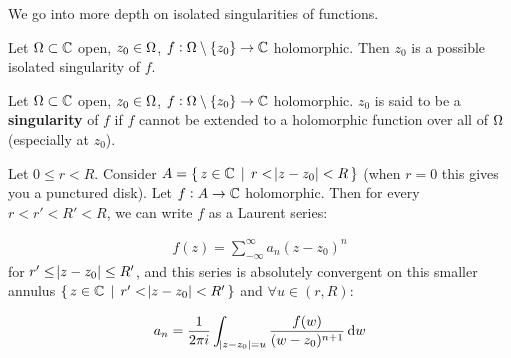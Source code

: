 \setcounter{section}{0}
\setcounter{theorem}{0}


We go into more depth on isolated singularities of functions.


Let $\Omega \subset \mathbb{C}$ open, $z_0 \in \Omega$, $f: \Omega \setminus \{ z_0 \} \to \mathbb{C}$ holomorphic. Then $z_0$ is a possible isolated singularity of $f$.


\begin{definition}[Singularity]

Let $\Omega \subset \mathbb{C}$ open, $z_0 \in \Omega$, $f: \Omega \setminus \{ z_0 \} \to \mathbb{C}$ holomorphic. $z_0$ is said to be a \textbf{singularity }of $f$ if $f$ cannot be extended to a holomorphic function over all of $\Omega$ (especially at $z_0$).

\end{definition}


\begin{theorem}
Let $0 \leq r < R $. Consider $A = \set{ z\in \mathbb{C}\, \mid \, r< \abs{z-z_0} <R }$ (when $r=0$ this gives you a punctured disk). Let $f: A \to \mathbb{C}$ holomorphic. Then for every $r<r'<R'<R$, we can write $f$ as a Laurent series:

\begin{align*}
    f(z) = \sum_{-\infty}^\infty a_n (z-z_0)^n
\end{align*}
for $r' \leq \abs{z-z_0} \leq R'$, and this series is absolutely convergent on this smaller annulus $\set{ z\in \mathbb{C}\, \mid \, r'< \abs{z-z_0} <R' }$ and $\forall u \in (r,R)$:

\begin{align*}
    a_n = \frac{1}{2 \pi i} \int_{\abs{z-z_0}=u} \frac{f(w)}{(w-z_0)^{n+1}} \dif w
\end{align*}
\end{theorem}


\begin{center}
\end{center}


